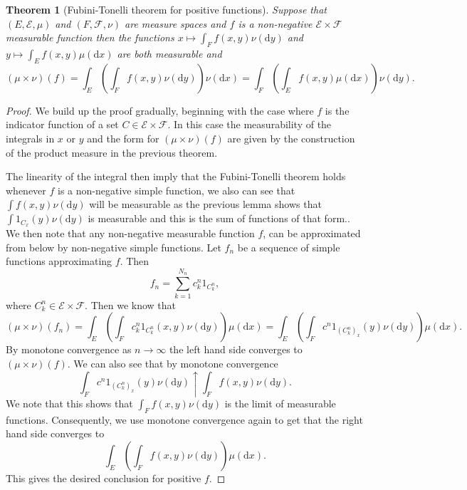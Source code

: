\documentclass[11pt]{article}
\newtheorem{thm}{Theorem}[section]
\theoremstyle{definition}
\theoremstyle{remark}
\begin{document}
\begin{thm}[Fubini-Tonelli theorem for positive functions]
Suppose that $(E, \mathcal{E}, \mu)$ and $(F, \mathcal{F}, \nu)$ are measure spaces and $f$ is a non-negative $\mathcal{E} \times \mathcal{F}$ measurable function then the functions $x \mapsto \int_F f(x,y) \nu(\mathrm{d}y)$ and $y \mapsto \int_E f(x,y) \mu(\mathrm{d}x)$ are both measurable and
\[(\mu \times \nu)(f) = \int_E \left( \int_F f(x,y) \nu(\mathrm{d}y) \right) \nu(\mathrm{d}x) = \int_F \left( \int_E f(x,y) \mu(\mathrm{d}x) \right) \nu(\mathrm{d}y). \]
\end{thm}
\begin{proof}
We build up the proof gradually, beginning with the case where $f$ is the indicator function of a set $C \in \mathcal{E} \times \mathcal{F}$. In this case the measurability of the integrals in $x$ or $y$ and the form for $(\mu \times \nu)(f)$ are given by the construction of the product measure in the previous theorem. 

The linearity of the integral then imply that the Fubini-Tonelli theorem holds whenever $f$ is a non-negative simple function, we also can see that $\int f(x,y) \nu(\mathrm{d}y)$ will be measurable as the previous lemma shows that $\int 1_{C_x}(y) \nu(\mathrm{d}y)$ is measurable and this is the sum of functions of that form.. We then note that any non-negative measurable function $f$, can be approximated from below by non-negative simple functions. Let $f_n$ be a sequence of simple functions approximating $f$. Then 
\[f_n = \sum_{k=1}^{N_n} c^n_k 1_{C^n_k}, \] where $C^n_k \in \mathcal{E} \times \mathcal{F}$. Then we know that
\[ (\mu \times \nu)(f_n) = \int_E \left( \int_F c^n_k 1_{C^n_k}(x,y) \nu(\mathrm{d}y) \right) \mu(\mathrm{d}x) = \int_E \left( \int_F c^n 1_{(C^n_k)_x}(y) \nu(\mathrm{d}y) \right)\mu(\mathrm{d}x). \] By monotone convergence as $n \rightarrow \infty$ the left hand side converges to $(\mu \times \nu)(f)$. We can also see that by monotone convergence
\[ \int_F c^n 1_{(C^n_k)_x}(y) \nu(\mathrm{d}y) \uparrow \int_F f(x,y) \nu(\mathrm{d}y). \] We note that this shows that $\int_F f(x,y) \nu(\mathrm{d}y)$ is the limit of measurable functions. Consequently, we use monotone convergence again to get that the right hand side converges to
\[ \int_E \left( \int_F f(x,y) \nu(\mathrm{d}y) \right) \mu(\mathrm{d}x). \] This gives the desired conclusion for positive $f$. 
\end{proof}
\end{document}
